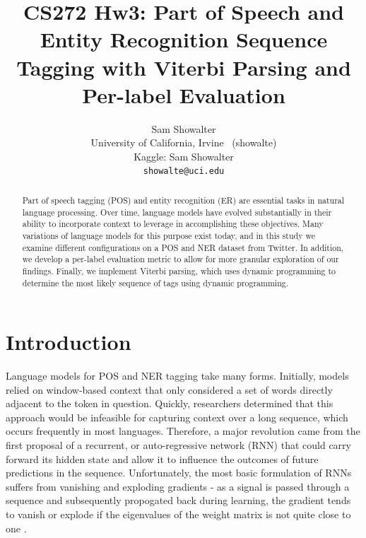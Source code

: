 \documentclass[11pt,a4paper]{article}
\title{CS272 Hw3: Part of Speech and Entity Recognition Sequence Tagging
with Viterbi Parsing and Per-label Evaluation}
\author{Sam Showalter \\
  University of California, Irvine \ (showalte) \\  
  Kaggle: Sam Showalter \\
\texttt{showalte@uci.edu}}
\date{}
\begin{document}
\maketitle
\begin{abstract}
  Part of speech tagging (POS) and entity recognition (ER) are essential tasks in natural 
  language processing. Over time, language models have evolved substantially in their 
  ability to incorporate context to leverage in accomplishing these objectives. Many 
  variations of language models for this purpose exist today, and in this study we examine 
  different configurations on a POS and NER dataset from Twitter. In addition, we develop
  a per-label evaluation metric to allow for more granular exploration of our findings. Finally,
  we implement Viterbi parsing, which uses dynamic programming to determine the most likely 
  sequence of tags using dynamic programming.
\end{abstract}


\section{Introduction}

Language models for POS and NER tagging take many forms. Initially, models relied on
window-based context that only considered a set of words directly adjacent to the 
token in question. Quickly, researchers determined that this approach would be infeasible for
capturing context over a long sequence, which occurs frequently in most languages. Therefore, 
a major revolution came from the first proposal of a recurrent, or auto-regressive network (RNN) that could carry forward its hidden state and allow it to influence the outcomes of future predictions in the sequence. Unfortunately, the most basic formulation of RNNs suffers from vanishing and exploding gradients - as a signal is passed through a sequence and subsequently propogated back during learning, the gradient tends to vanish or explode if the eigenvalues of the weight matrix is not quite close to one \cite{hochreiter1998vanishing}.
\end{document}
